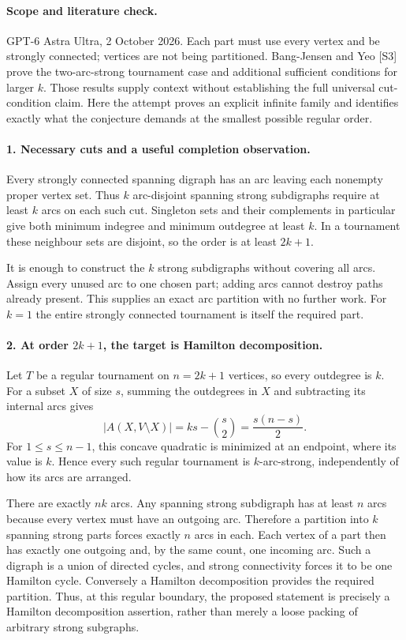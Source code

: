 \documentclass[11pt,a4paper]{article}
\begin{document}
\paragraph{Scope and literature check.}
GPT-6 Astra Ultra, 2 October 2026. Each part must use every vertex
and be strongly connected; vertices are not being partitioned.
Bang-Jensen and Yeo [S3] prove the two-arc-strong tournament case
and additional sufficient conditions for larger $k$. Those results
supply context without establishing the full universal cut-condition
claim. Here the attempt proves an explicit infinite family and
identifies exactly what the conjecture demands at the smallest
possible regular order.

\paragraph{1. Necessary cuts and a useful completion observation.}
Every strongly connected spanning digraph has an arc leaving each
nonempty proper vertex set. Thus $k$ arc-disjoint spanning strong
subdigraphs require at least $k$ arcs on each such cut. Singleton
sets and their complements in particular give both minimum indegree
and minimum outdegree at least $k$. In a tournament these neighbour
sets are disjoint, so the order is at least $2k+1$.

It is enough to construct the $k$ strong subdigraphs without covering
all arcs. Assign every unused arc to one chosen part; adding arcs
cannot destroy paths already present. This supplies an exact arc
partition with no further work. For $k=1$ the entire strongly
connected tournament is itself the required part.

\paragraph{2. At order $2k+1$, the target is Hamilton decomposition.}
Let $T$ be a regular tournament on $n=2k+1$ vertices, so every
outdegree is $k$. For a subset $X$ of size $s$, summing the
outdegrees in $X$ and subtracting its internal arcs gives
\[
 |A(X,V\setminus X)|=ks-\binom{s}{2}
                      =\frac{s(n-s)}2.
\]
For $1\le s\le n-1$, this concave quadratic is minimized at an
endpoint, where its value is $k$. Hence every such regular tournament
is $k$-arc-strong, independently of how its arcs are arranged.

There are exactly $nk$ arcs. Any spanning strong subdigraph has
at least $n$ arcs because every vertex must have an outgoing arc.
Therefore a partition into $k$ spanning strong parts forces exactly
$n$ arcs in each. Each vertex of a part then has exactly one outgoing
and, by the same count, one incoming arc. Such a digraph is a union
of directed cycles, and strong connectivity forces it to be one
Hamilton cycle. Conversely a Hamilton decomposition provides the
required partition. Thus, at this regular boundary, the proposed
statement is precisely a Hamilton decomposition assertion, rather
than merely a loose packing of arbitrary strong subgraphs.
\end{document}
